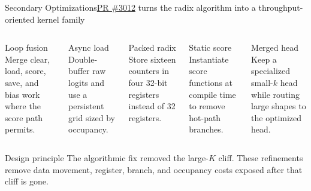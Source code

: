 \documentclass[aspectratio=169,10pt]{beamer}
\renewcommand{\NvidiaSource}[1]{}
\begin{document}
\begin{frame}{Secondary Optimizations}{\href{https://github.com/NVIDIA/TransformerEngine/pull/3012}{PR \#3012} turns the radix algorithm into a throughput-oriented kernel family}
  \NvidiaSource{TE PR \href{https://github.com/NVIDIA/TransformerEngine/pull/3012}{\#3012};
    commits 6d6005a7, 69a7c46f, 00b0dad2, 47c98811, 9cfb651a}
  \vspace{.04in}
  \begin{columns}[T,onlytextwidth]
    \begin{column}{.19\textwidth}
      {\NvidiaSansMedium Loop fusion}\NvidiaTightRule{.6pt}\vspace{.05in}
      \small Merge clear, load, score, save, and bias work where the score path permits.
    \end{column}
    \begin{column}{.19\textwidth}
      {\NvidiaSansMedium Async load}\NvidiaTightRule{.6pt}\vspace{.05in}
      \small Double-buffer raw logits and use a persistent grid sized by occupancy.
    \end{column}
    \begin{column}{.19\textwidth}
      {\NvidiaSansMedium Packed radix}\NvidiaTightRule{.6pt}\vspace{.05in}
      \small Store sixteen counters in four 32-bit registers instead of 32 registers.
    \end{column}
    \begin{column}{.19\textwidth}
      {\NvidiaSansMedium Static score}\NvidiaTightRule{.6pt}\vspace{.05in}
      \small Instantiate score functions at compile time to remove hot-path branches.
    \end{column}
    \begin{column}{.19\textwidth}
      {\NvidiaSansMedium Merged head}\NvidiaTightRule{.6pt}\vspace{.05in}
      \small Keep a specialized small-$k$ head while routing large shapes to the optimized head.
    \end{column}
  \end{columns}
  \vspace{.18in}
  \begin{NvidiaEvidence}{Design principle}
    The algorithmic fix removed the large-$K$ cliff. These refinements remove data movement,
    register, branch, and occupancy costs exposed after that cliff is gone.
  \end{NvidiaEvidence}
\end{frame}
\end{document}
